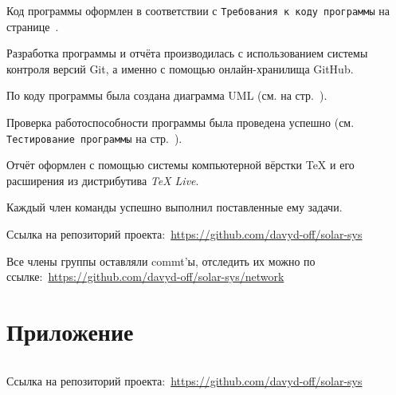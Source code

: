 \documentclass[14pt, oneside]{altsu-report}
\begin{document}
Код программы оформлен в соответствии с \texttt{Требования к коду программы} на странице~\pageref{requirement}.

Разработка программы и отчёта производилась с использованием системы контроля версий Git, а именно с помощью онлайн-хранилища GitHub.

По коду программы была создана диаграмма UML (см. на стр.~\pageref{uml}).

Проверка работоспособности программы была проведена успешно (см. \texttt{Тестирование программы} на стр.~\pageref{test}).

Отчёт оформлен с помощью системы компьютерной вёрстки \TeX{} и его расширения \XeTeX{} из дистрибутива \textit{TeX Live}.

Каждый член команды успешно выполнил поставленные ему задачи.

Ссылка на репозиторий проекта:~\textcolor{blue}{\url{https://github.com/davyd-off/solar-sys}}

Все члены группы оставляли commt'ы, отследить их можно по ссылке:~\textcolor{blue}{\url{https://github.com/davyd-off/solar-sys/network}}

\newpage
{}
\printbibliography[title={Список использованной литературы}]

\newpage
\chapter*{Приложение}

\begin{code}
\label{code:solar-sys}
\inputminted[mathescape,linenos,frame=lines,breaklines]{Python}{src/SolarSystem.py}
\end{code}
Ссылка на репозиторий проекта:~\textcolor{blue}{\url{https://github.com/davyd-off/solar-sys}}
\end{document}
